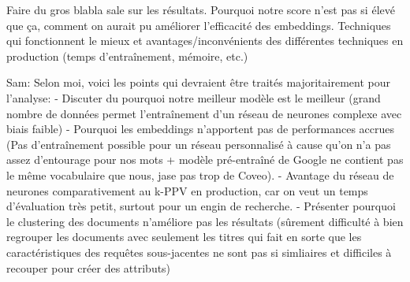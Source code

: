 Faire du gros blabla sale sur les résultats. Pourquoi notre score n'est pas si élevé que ça, comment on aurait pu améliorer l'efficacité des embeddings. Techniques qui fonctionnent le mieux et avantages/inconvénients des différentes techniques en production (temps d'entraînement, mémoire, etc.)

Sam: Selon moi, voici les points qui devraient être traités majoritairement pour l'analyse:
	- Discuter du pourquoi notre meilleur modèle est le meilleur (grand nombre de données permet l'entraînement d'un réseau de neurones complexe avec biais faible)
	- Pourquoi les embeddings n'apportent pas de performances accrues (Pas d'entraînement possible pour un réseau personnalisé à cause qu'on n'a pas assez d'entourage pour nos mots + modèle pré-entraîné de Google ne contient pas le même vocabulaire que nous, jase pas trop de Coveo).
	- Avantage du réseau de neurones comparativement au k-PPV en production, car on veut un temps d'évaluation très petit, surtout pour un engin de recherche.
	- Présenter pourquoi le clustering des documents n'améliore pas les résultats (sûrement difficulté à bien regrouper les documents avec seulement les titres qui fait en sorte que les caractéristiques des requêtes sous-jacentes ne sont pas si simliaires et difficiles à recouper pour créer des attributs)
	